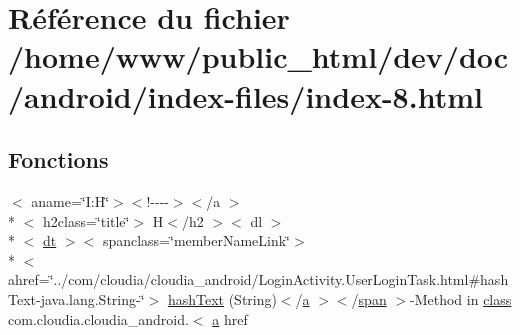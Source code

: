\hypertarget{index-8_8html}{\section{Référence du fichier /home/www/public\-\_\-html/dev/doc/android/index-\/files/index-\/8.html}
\label{index-8_8html}
}
\subsection*{Fonctions}
\begin{DoxyCompactItemize}
\item 
$<$ aname=\char`\"{}I\-:\-H\char`\"{}$>$$<$!-\/-\/-\/-\/$>$$<$/a $>$\\*
$<$ h2class=\char`\"{}title\char`\"{}$>$ H$<$/h2 $>$$<$ dl $>$\\*
$<$ \hyperlink{stylesheet_8css_a107565fb4039d33b041380d6e0ea1d80}{dt} $>$$<$ spanclass=\char`\"{}member\-Name\-Link\char`\"{}$>$\\*
$<$ ahref=\char`\"{}../com/cloudia/cloudia\-\_\-android/Login\-Activity.\-User\-Login\-Task.\-html\#hash\-Text-\/java.\-lang.\-String-\/\char`\"{}$>$ \hyperlink{index-8_8html_aa1b83d0386780c23608ff7da6e9fda1c}{hash\-Text} (String)$<$/\hyperlink{style_8css_a5e8981582017bb8b84c21f148345d1f7}{a} $>$$<$/\hyperlink{stylesheet_8css_a8343996ebcf16220b04e54659aac31cc}{span} $>$-\/Method in \hyperlink{_tools_8html_acf06f836132665ba8114f5a414c2403f}{class} com.\-cloudia.\-cloudia\-\_\-android.$<$ \hyperlink{style_8css_a5e8981582017bb8b84c21f148345d1f7}{a} href
\end{DoxyCompactItemize}
